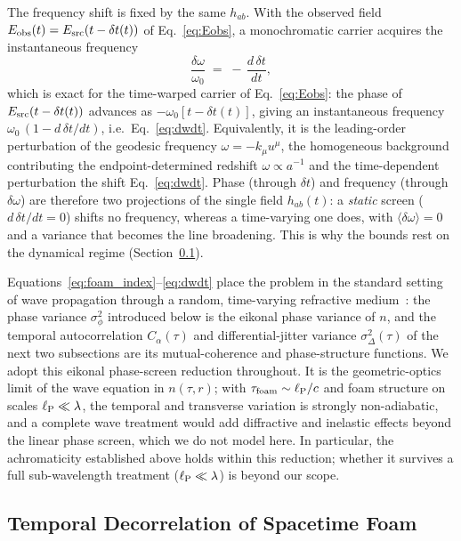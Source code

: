 \documentclass[aps,prd,onecolumn,amsmath,amssymb]{revtex4-2}
\begin{document}
The frequency shift is fixed by the same $h_{ab}$.  With the observed
field $E_{\rm obs}(t)=E_{\rm src}(t-\delta t(t))$ of
Eq.~\eqref{eq:Eobs}, a monochromatic carrier acquires the instantaneous
frequency
\begin{equation}
  \frac{\delta\omega}{\omega_0} \;=\; -\,\frac{d\,\delta t}{dt},
  \label{eq:dwdt}
\end{equation}
which is exact for the time-warped carrier of Eq.~\eqref{eq:Eobs}: the
phase of $E_{\rm src}(t-\delta t(t))$ advances as
$-\omega_0[t-\delta t(t)]$, giving an instantaneous frequency
$\omega_0\,(1-d\,\delta t/dt)$, i.e.\ Eq.~\eqref{eq:dwdt}.  Equivalently,
it is the leading-order perturbation of the geodesic frequency
$\omega=-k_\mu u^\mu$, the homogeneous background contributing the
endpoint-determined redshift $\omega\propto a^{-1}$ and the time-dependent
perturbation the shift Eq.~\eqref{eq:dwdt}.  Phase
(through $\delta t$) and frequency (through $\delta\omega$) are therefore
two projections of the single field $h_{ab}(t)$: a \emph{static} screen
($d\,\delta t/dt=0$) shifts no frequency, whereas a time-varying one
does, with $\langle\delta\omega\rangle=0$ and a variance that becomes the
line broadening.  This is why the bounds rest on the dynamical regime
(Section~\ref{sec:Calpha_origin}).

Equations~\eqref{eq:foam_index}--\eqref{eq:dwdt} place the problem in the
standard setting of wave propagation through a random, time-varying
refractive medium~\cite{Ishimaru1978,Flatte1979,Rickett1990}: the phase
variance $\sigma_\phi^2$ introduced below is the eikonal phase variance
of $n$, and the temporal autocorrelation $C_\alpha(\tau)$ and
differential-jitter variance $\sigma_\Delta^2(\tau)$ of the next two
subsections are its mutual-coherence and phase-structure functions.  We
adopt this eikonal phase-screen reduction throughout.  It is the
geometric-optics limit of the wave equation in $n(\tau,r)$; with
$\tau_{\rm foam}\sim\ell_{\rm P}/c$ and foam structure on scales
$\ell_{\rm P}\ll\lambda$, the temporal and transverse variation is
strongly non-adiabatic, and a complete wave treatment would add
diffractive and inelastic effects beyond the linear phase screen, which
we do not model here.  In particular, the achromaticity established above
holds within this reduction; whether it survives a full sub-wavelength
treatment ($\ell_{\rm P}\ll\lambda$) is beyond our scope.

\subsection{Temporal Decorrelation of Spacetime Foam}
\label{sec:Calpha_origin}
\end{document}
